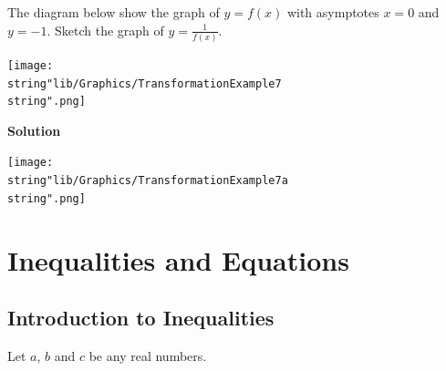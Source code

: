 \documentclass[11pt,a4paper]{book}
\begin{document}
\begin{example}{}

The diagram below show the graph of $y=f\left(x\right)$ with asymptotes
$x=0$ and $y=-1$. Sketch the graph of ${\displaystyle y=\frac{1}{f\left(x\right)}}$.

\begin{minipage}[t]{0.5\textwidth}

\vspace{.6cm}

\begin{center}
\texttt{[image: \\string"lib/Graphics/TransformationExample7\\string".png]}
\par\end{center}

\end{minipage}
\begin{minipage}[t]{0.5\textwidth}

\textbf{Solution}
\begin{center}
\texttt{[image: \\string"lib/Graphics/TransformationExample7a\\string".png]}
\par\end{center}
\end{minipage}

\end{example}



\chapter{Inequalities and Equations}


\section{Introduction to Inequalities}

Let $a$, $b$ and $c$ be any real numbers.
\end{document}
